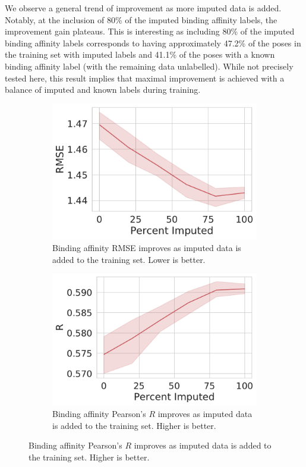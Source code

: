 \documentclass[journal=jmcmar,manuscript=article]{achemso}
\begin{document}
We observe a general trend of improvement as more imputed data is added.
Notably, at the inclusion of 80\% of the imputed binding affinity labels, the improvement gain plateaus.
This is interesting as including 80\% of the imputed binding affinity labels corresponds to having approximately 47.2\% of the poses in the training set with imputed labels and 41.1\% of the poses with a known binding affinity label (with the remaining data unlabelled).
While not precisely tested here, this result implies that maximal improvement is achieved with a balance of imputed and known labels during training.

\begin{figure}[tbph]
    \centering
    \begin{subfigure}[t]{0.48\textwidth}
        \centering
        \includegraphics[width=\linewidth]{figures/MedGOEns_addingImpRMSE.pdf}
        \caption{Binding affinity RMSE improves as imputed data is added to the training set. Lower is better.}
    \end{subfigure}
    \hfill
    \begin{subfigure}[t]{0.48\textwidth}
        \centering
        \includegraphics[width=\linewidth]{figures/MedGOEns_addingImpR.pdf}
        \caption{Binding affinity Pearson's $R$ improves as imputed data is added to the training set. Higher is better.}
    \end{subfigure}


\end{figure}
\end{document}
